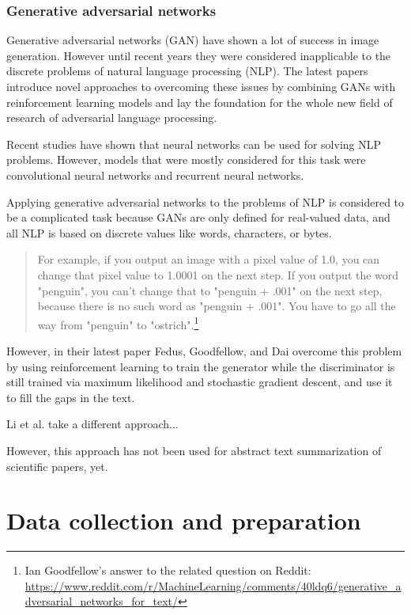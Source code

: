 \documentclass[sigplan]{acmart}
\begin{document}
\subsubsection{Generative adversarial networks}
Generative adversarial networks (GAN) have shown a lot of success in image generation. However until recent years they were considered inapplicable to the discrete problems of natural language processing (NLP). The latest papers introduce novel approaches to overcoming these issues by combining GANs with reinforcement learning models and lay the foundation for the whole new field of research of adversarial language processing.

Recent studies have shown that neural networks can be used for solving NLP problems. However, models that were mostly considered for this task were convolutional neural networks and recurrent neural networks.

Applying generative adversarial networks to the problems of NLP is considered to be a complicated task because GANs are only defined for real-valued data, and all NLP is based on discrete values like words, characters, or bytes.

\begin{quote}
For example, if you output an image with a pixel value of 1.0, you can change that pixel value to 1.0001 on the next step. If you output the word "penguin", you can't change that to "penguin + .001" on the next step, because there is no such word as "penguin + .001". You have to go all the way from "penguin" to "ostrich".\footnote{Ian Goodfellow's answer to the related question on Reddit: \url{https://www.reddit.com/r/MachineLearning/comments/40ldq6/generative_adversarial_networks_for_text/}}
\end{quote}

However, in their latest paper Fedus, Goodfellow, and Dai\cite{fedus-18} overcome this problem by using reinforcement learning to train the generator while the discriminator is still trained via maximum likelihood and stochastic gradient descent, and use it to fill the gaps in the text.

Li et al.\cite{li-pan-18} take a different approach...
 
However, this approach has not been used for abstract text summarization of scientific papers, yet.

\section{Data collection and preparation}
\end{document}

